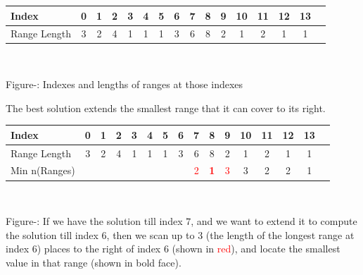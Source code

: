 \documentclass[11pt]{article}
\begin{document}
\begin{center}
  \begin{tabular}{|l|c|c|c|c|c|c|c|c|c|c|c|c|c|c|c|}
    \hline
    Index        & 0 & 1 & 2 & 3 & 4 & 5 & 6 & 7 & 8 & 9 &10 &11 &12 &13\\
    \hline
    Range Length & 3 & 2 & 4 & 1 & 1 & 1 & 3 & 6 & 8 & 2 & 1 & 2 & 1 & 1\\
    \hline
  \end{tabular}\\
  \vspace{0.3cm}

  \addtocounter{figure}{1}
  \footnotesize{Figure-: Indexes and lengths of ranges
    at those indexes}
\end{center}

The best solution extends the smallest range that it can cover to its
right.

\begin{center}
  \begin{tabular}{|l|c|c|c|c|c|c|c|c|c|c|c|c|c|c|c|}
    \hline
    Index         & 0 & 1 & 2 & 3 & 4 & 5 & 6 & 7 & 8 & 9 &10 &11 &12 &13\\
    \hline
    Range Length  & 3 & 2 & 4 & 1 & 1 & 1 & 3 & 6 & 8 & 2 & 1 & 2 & 1 & 1\\
    \hline
    Min n(Ranges) &  &  &  &  &  &  &  & \textcolor{red}{2} & \textbf{\textcolor{red}{1}} & \textcolor{red}{3} & 3 & 2 & 2 & 1\\
    \hline
  \end{tabular}\\
  \vspace{0.3cm}

  \addtocounter{figure}{1}
  \footnotesize{Figure-: If we have the solution till
    index $7$, and we want to extend it to compute the solution till
    index $6$, then we scan up to $3$ (the length of the longest range
    at index $6$) places to the right of index $6$ (shown in
    \textcolor{red}{red}), and locate the smallest value in that range
    (shown in bold face).}
\end{center}
\end{document}
